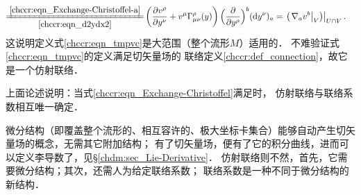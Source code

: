 \begin{align*}
     \xlongequal[\ref{chccr:eqn_d2ydx2}]{\ref{chccr:eqn_Exchange-Christoffel-a}} &
      \left( \frac{\partial v^\rho}{\partial y^\nu}
     +v^\mu \Gamma^{\rho}_{\mu\nu}(y) \right)
     \Bigl(\frac{\partial}{\partial y^\rho}\Bigr)^b({\rm d}y^\nu)_a
     = \left. \left(\left. \nabla_a v^b \right|_{V}\right) \right|_{U\cap V}  .
\end{align*}
这说明定义式\eqref{chccr:eqn_tmpvc}是大范围（整个流形$M$）适用的．
不难验证式\eqref{chccr:eqn_tmpvc}的定义满足{\kaishu 切矢量场}的
联络定义\ref{chccr:def_connection}，故它是一个仿射联络．

\begin{remark}\label{chccr:remark_con-Nabla}
上面论述说明：当式\eqref{chccr:eqn_Exchange-Christoffel}满足时，
仿射联络与联络系数相互唯一确定．
\end{remark}




    微分结构（即覆盖整个流形的、相互容许的、极大坐标卡集合）能够自动产生切矢量场的概念，无需其它附加结构；
    有了切矢量场，便有了它的积分曲线，进而可以定义李导数了，见\S\ref{chdm:sec_Lie-Derivative}．
    仿射联络则不然，首先，它需要微分结构；其次，还需人为给定联络系数；
    联络系数是一种不同于微分结构的新结构．




